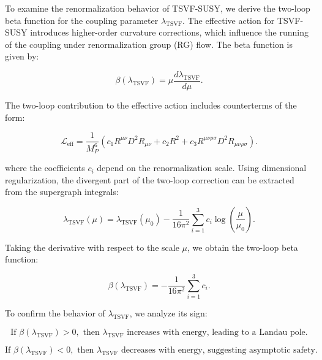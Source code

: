 \documentclass[12pt, onecolumn]{article}
\theoremstyle{definition}
\numberwithin{equation}{section}
\begin{document}
To examine the renormalization behavior of TSVF-SUSY, we derive the two-loop beta function for the coupling parameter \( \lambda_{\text{TSVF}} \). The effective action for TSVF-SUSY introduces higher-order curvature corrections, which influence the running of the coupling under renormalization group (RG) flow. The beta function is given by:

\begin{equation}
    \beta(\lambda_{\text{TSVF}}) = \mu \frac{d\lambda_{\text{TSVF}}}{d\mu}.
    \label{eq:beta-function-def}
\end{equation}

The two-loop contribution to the effective action includes counterterms of the form:

\begin{equation}
    \mathcal{L}_{\text{eff}} = \frac{1}{M_P^6} \left( c_1 R^{\mu\nu} D^2 R_{\mu\nu} + c_2 R^2 + c_3 R^{\mu\nu\rho\sigma} D^2 R_{\mu\nu\rho\sigma} \right).
    \label{eq:effective-action-beta}
\end{equation}

where the coefficients \( c_i \) depend on the renormalization scale. Using dimensional regularization, the divergent part of the two-loop correction can be extracted from the supergraph integrals:

\begin{equation}
    \lambda_{\text{TSVF}}(\mu) = \lambda_{\text{TSVF}}(\mu_0) - \frac{1}{16\pi^2} \sum_{i=1}^{3} c_i \log \left( \frac{\mu}{\mu_0} \right).
    \label{eq:lambda-renormalization}
\end{equation}

Taking the derivative with respect to the scale \( \mu \), we obtain the two-loop beta function:

\begin{equation}
    \beta(\lambda_{\text{TSVF}}) = -\frac{1}{16\pi^2} \sum_{i=1}^{3} c_i.
    \label{eq:two-loop-beta-result}
\end{equation}

To confirm the behavior of \( \lambda_{\text{TSVF}} \), we analyze its sign:

\begin{equation}
    \text{If } \beta(\lambda_{\text{TSVF}}) > 0, \text{ then } \lambda_{\text{TSVF}} \text{ increases with energy, leading to a Landau pole.}
    \label{eq:beta-positive}
\end{equation}

\begin{equation}
    \text{If } \beta(\lambda_{\text{TSVF}}) < 0, \text{ then } \lambda_{\text{TSVF}} \text{ decreases with energy, suggesting asymptotic safety.}
    \label{eq:beta-negative}
\end{equation}
\end{document}
